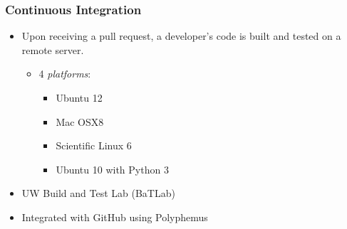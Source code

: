 \documentclass[12pt]{beamer}
\begin{document}
\begin{frame}
\frametitle{Continuous Integration \cite{beck1998extreme}}

\begin{itemize}
\item{Upon receiving a pull request, a developer's code is built and tested on a remote server.}
    \begin{itemize}
    \item{4 \emph{platforms}:}
        \begin{itemize}
        \item{Ubuntu 12}
        \item{Mac OSX8}
        \item{Scientific Linux 6}
        \item{Ubuntu 10 with Python 3}
        \end{itemize}
    \end{itemize}
\item{UW Build and Test Lab (BaTLab) \cite{batlab_2014}}
\item{Integrated with GitHub using Polyphemus \cite{polyphemus_2014}}
\end{itemize}
\end{frame}
\end{document}
